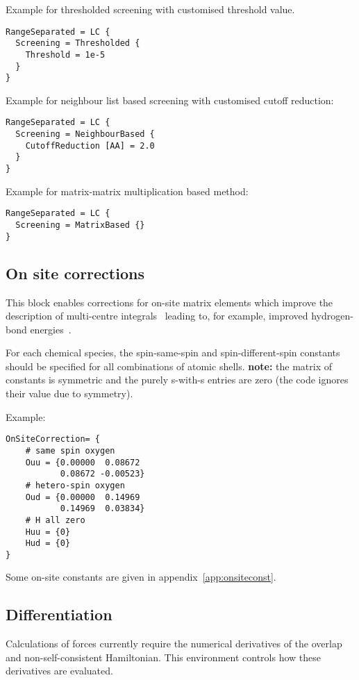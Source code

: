 Example for thresholded screening with customised threshold value.
\begin{verbatim}
RangeSeparated = LC {
  Screening = Thresholded {
    Threshold = 1e-5
  }
}
\end{verbatim}

Example for neighbour list based screening with customised cutoff reduction:
\begin{verbatim}
RangeSeparated = LC {
  Screening = NeighbourBased {
    CutoffReduction [AA] = 2.0
  }
}
\end{verbatim}

Example for matrix-matrix multiplication based method:
\begin{verbatim}
RangeSeparated = LC {
  Screening = MatrixBased {}
}
\end{verbatim}


\subsection{On site corrections}
\label{sec:dftbp.Onsites}

This block enables corrections for on-site matrix elements which improve the
description of multi-centre integrals~\cite{garcia14Thesis} leading to, for
example, improved hydrogen-bond energies~\cite{dominguez15}.

For each chemical species, the spin-same-spin and spin-different-spin constants
should be specified for all combinations of atomic shells. {\bf note:} the
matrix of constants is symmetric and the purely s-with-s entries are zero (the
code ignores their value due to symmetry).

Example:
\begin{verbatim}
OnSiteCorrection= {
    # same spin oxygen
    Ouu = {0.00000  0.08672
           0.08672 -0.00523}
    # hetero-spin oxygen
    Oud = {0.00000  0.14969
           0.14969  0.03834}
    # H all zero
    Huu = {0}
    Hud = {0}
}
\end{verbatim}

Some on-site constants are given in appendix~\ref{app:onsiteconst}.

\subsection{Differentiation}
\label{sec:dftbp.Differentiation}

Calculations of forces currently require the numerical derivatives of the
overlap and non-self-consistent Hamiltonian. This environment controls how these
derivatives are evaluated.


